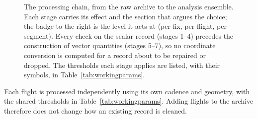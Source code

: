 \begin{figure}[tbp]
  \caption{The processing chain, from the raw archive to the analysis ensemble. Each
  stage carries its effect and the section that argues the choice; the badge to the
  right is the level it acts at
  (\textcolor{figred}{per fix}, \textcolor{figblue}{per flight},
  \textcolor{figgreen}{per segment}). Every check on the scalar record (stages 1--4)
  precedes the construction of vector quantities (stages 5--7), so no coordinate
  conversion is computed for a record about to be repaired or dropped. The thresholds
  each stage applies are listed, with their symbols, in
  Table~\ref{tab:workingparams}.}
  \label{fig:pipelinemap}
\end{figure}

Each flight is processed independently using its own cadence and geometry, with
the shared thresholds in Table~\ref{tab:workingparams}. Adding flights to the
archive therefore does not change how an existing record is cleaned.


